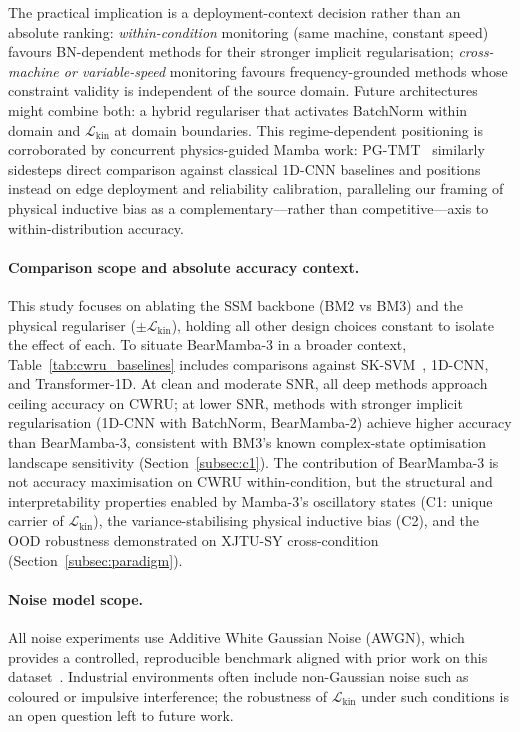 The practical implication is a deployment-context decision rather than an
absolute ranking:
\emph{within-condition} monitoring (same machine, constant speed) favours
BN-dependent methods for their stronger implicit regularisation;
\emph{cross-machine or variable-speed} monitoring favours frequency-grounded
methods whose constraint validity is independent of the source domain.
Future architectures might combine both: a hybrid regulariser that activates
BatchNorm within domain and $\mathcal{L}_{\text{kin}}$ at domain boundaries.
This regime-dependent positioning is corroborated by concurrent
physics-guided Mamba work: PG-TMT~\cite{li2026pgtmt} similarly
sidesteps direct comparison against classical 1D-CNN baselines and
positions instead on edge deployment and reliability calibration,
paralleling our framing of physical inductive bias as a
complementary---rather than competitive---axis to within-distribution
accuracy.

\paragraph{Comparison scope and absolute accuracy context.}
This study focuses on ablating the SSM backbone (BM2 vs BM3) and the
physical regulariser ($\pm\mathcal{L}_{\text{kin}}$), holding all other
design choices constant to isolate the effect of each.
To situate BearMamba-3 in a broader context,
Table~\ref{tab:cwru_baselines} includes comparisons against
SK-SVM~\cite{antoni2006spectral_kurtosis}, 1D-CNN, and Transformer-1D.
At clean and moderate SNR, all deep methods approach ceiling accuracy on
CWRU; at lower SNR, methods with stronger implicit regularisation (1D-CNN
with BatchNorm, BearMamba-2) achieve higher accuracy than BearMamba-3,
consistent with BM3's known complex-state optimisation landscape sensitivity
(Section~\ref{subsec:c1}).
The contribution of BearMamba-3 is not accuracy maximisation on
CWRU within-condition, but the structural and interpretability properties
enabled by Mamba-3's oscillatory states (C1: unique carrier of
$\mathcal{L}_{\text{kin}}$), the variance-stabilising physical inductive bias
(C2), and the OOD robustness demonstrated on XJTU-SY cross-condition
(Section~\ref{subsec:paradigm}).

\paragraph{Noise model scope.}
All noise experiments use Additive White Gaussian Noise (AWGN), which
provides a controlled, reproducible benchmark aligned with prior work on
this dataset~\cite{zhang2020deep}.
Industrial environments often include non-Gaussian noise such as coloured
or impulsive interference; the robustness of $\mathcal{L}_{\text{kin}}$
under such conditions is an open question left to future work.

